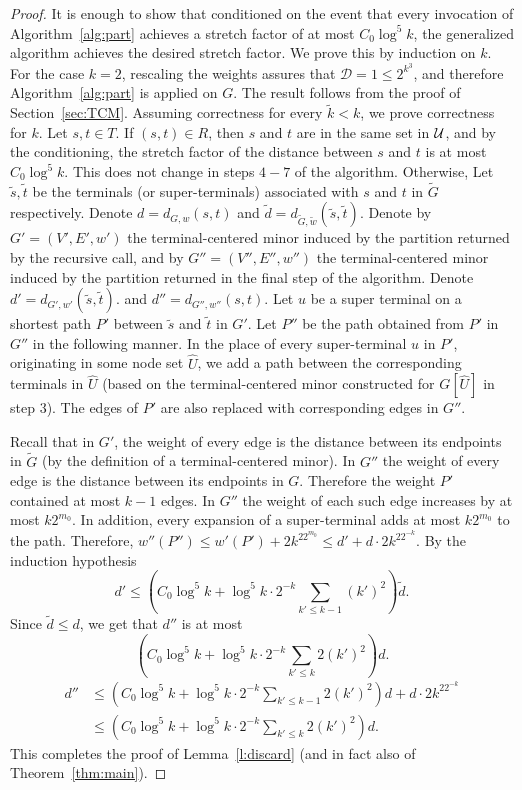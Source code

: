 \documentclass[twoside,leqno,twocolumn]{article}
\newcommand{\calD}{{\mathcal D}}
\begin{document}
\begin{proof}
It is enough to show that conditioned on the event that every invocation of Algorithm~\ref{alg:part} achieves a stretch factor of at most $C_0 \log^5k$, the generalized algorithm achieves the desired stretch factor.
We prove this by induction on $k$. For the case $k=2$, rescaling the weights assures that $\calD=1 \le 2^{k^3}$, and therefore Algorithm~\ref{alg:part} is applied on $G$. The result follows from the proof of Section~\ref{sec:TCM}. Assuming correctness for every $\tilde{k} < k$, we prove correctness for $k$. 
Let $s,t \in T$. If $(s,t) \in R$, then $s$ and $t$ are in the same set in ${\cal U}$, and by the conditioning, the stretch factor of the distance between $s$ and $t$ is at most $C_0 \log^5k$. This does not change in steps $4-7$ of the algorithm.
Otherwise, Let $\tilde{s},\tilde{t}$ be the terminals (or super-terminals) associated with $s$ and $t$ in $\tilde{G}$ respectively.
Denote $d=d_{G,w}(s,t)$ and $\tilde{d} = d_{\tilde{G},\tilde{w}}(\tilde{s},\tilde{t})$. Denote by $G'=(V',E',w')$ the terminal-centered minor induced by the partition returned by the recursive call, and by $G''=(V'',E'',w'')$ the terminal-centered minor induced by the partition returned in the final step of the algorithm. 
Denote $d'=d_{G',w'}(\tilde{s},\tilde{t})$. and $d''=d_{G'',w''}(s,t)$.
Let $u$ be a super terminal on a shortest path $P'$ between $\tilde{s}$ and $\tilde{t}$ in $G'$.
Let $P''$ be the path obtained from $P'$ in $G''$ in the following manner. In the place of every super-terminal $u$ in $P'$, originating in some node set $\hat{U}$, we add a path between the corresponding terminals in $\hat{U}$ (based on the terminal-centered minor constructed for $G[\hat{U}]$ in step $3$). The edges of $P'$ are also replaced with corresponding edges in $G''$.

Recall that in $G'$, the weight of every edge is the distance between its endpoints in $\tilde{G}$ (by the definition of a terminal-centered minor). In $G''$ the weight of every edge is the distance between its endpoints in $G$. Therefore the weight 
$P'$ contained at most $k-1$ edges. In $G''$ the weight of each such edge increases by at most $k 2^{m_0}$. In addition, every expansion of a super-terminal adds at most $k 2^{m_0}$ to the path. Therefore, $w''(P'') \le w'(P') + 2k^22^{m_0} \le d' + d \cdot 2k^22^{-k}$.
By the induction hypothesis $$d' \le \left(C_0 \log^5 k + \log^5 k \cdot 2^{-k} \sum_{k' \le k-1}{(k')^2}\right)\tilde{d}.$$ 
Since $\tilde{d} \le d$, we get that 
\ifprocs
$d''$ is at most
\begin{equation*}
\left(C_0 \log^5 k + \log^5 k \cdot 2^{-k} \sum_{k' \le k}{2(k')^2}\right)d.
\end{equation*}
\else
\begin{equation*}
\begin{split}
d'' &\le \left(C_0 \log^5 k + \log^5 k \cdot 2^{-k} \sum_{k' \le k-1}{2(k')^2}\right)d + d \cdot 2k^22^{-k} \\
&\le \left(C_0 \log^5 k + \log^5 k \cdot 2^{-k} \sum_{k' \le k}{2(k')^2}\right)d.
\end{split}
\end{equation*}
\fi
This completes the proof of Lemma~\ref{l:discard}
(and in fact also of Theorem~\ref{thm:main}).
\end{proof}
\end{document}
